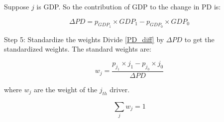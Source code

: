 \documentclass{article}
\numberwithin{equation}{section}
\begin{document}
Suppose $j$ is GDP. So the contribution of GDP to the change in PD is:

\begin{equation}
\label{PD_diff_GDP}
\Delta PD = p_{GDP_1} \times GDP_1 - p_{GDP_0} \times GDP_0
\end{equation}

Step 5: Standardize the weights
\label{std_weights}
Divide \ref{PD_diff} by $\Delta PD$ to get the standardized weights. The standard weights are:

\begin{equation}
\label{std_weights}
w_j = \frac{p_{j_1} \times j_1 - p_{j_0} \times j_0}{\Delta PD}
\end{equation}

where $w_{j}$ are the weight of the $j_{th}$ driver.

$$\sum_j w_j = 1$$
\end{document}
